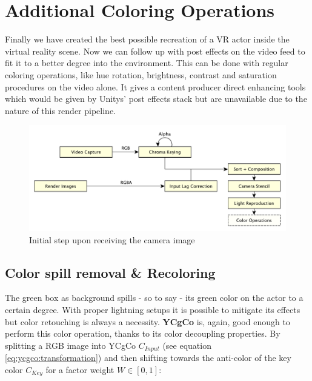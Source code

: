 %
\section{Additional Coloring Operations}

Finally we have created the best possible recreation of a VR actor inside the 
virtual reality scene. Now we can follow up with post effects on the video feed 
to fit it to a better degree into the environment. This can be done with 
regular coloring operations, like hue rotation, brightness, contrast and 
saturation procedures on the video alone. It gives a content producer direct 
enhancing tools which would be given by Unitys' post effects stack but are 
unavailable due to the nature of this render pipeline.

\begin{figure}[htb]
	\includegraphics[width=\textwidth]{_raw_resources/pipeline_steps/4_8_color.pdf}
	\caption{Initial step upon receiving the camera image}
	\label{fig:steps:recolor}
\end{figure}

\subsection{Color spill removal \& Recoloring}

The green box as background spills - so to say - its green color on the actor 
to a certain degree. With proper lightning setups it is possible to mitigate 
its effects but color retouching is always a necessity. \textbf{YCgCo} is, 
again, good enough to perform this color operation, thanks to its color 
decoupling properties. By splitting a RGB image into YCgCo $C_{Input}$ (see 
equation \eqref{eq:ycgco:transformation}) and then shifting towards the 
anti-color of the key color $C_{Key}$ for a factor weight $W \in [0, 1]$:


